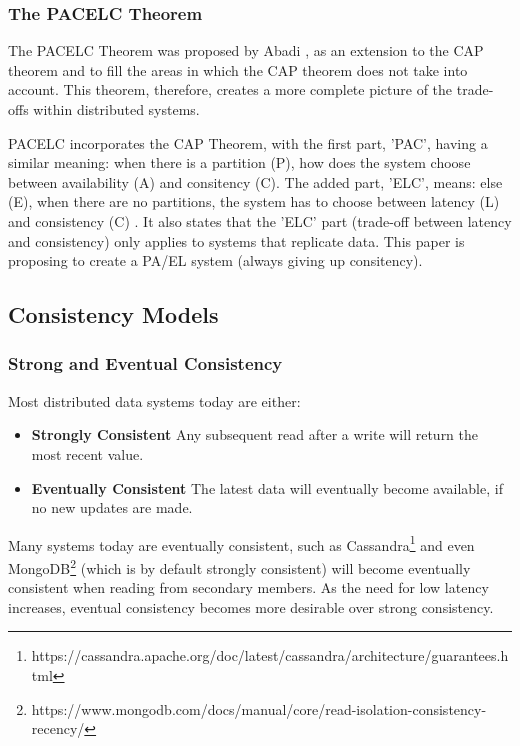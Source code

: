 \documentclass[12pt]{article}
\begin{document}
\subsubsection{The PACELC Theorem}
The PACELC Theorem was proposed by Abadi \cite{6127847}, as an extension to the CAP theorem and to fill the areas in which the CAP theorem does not take into account. This theorem, therefore, creates a more complete picture of the trade-offs within distributed systems. \par
PACELC incorporates the CAP Theorem, with the first part, 'PAC', having a similar meaning: when there is a partition (P), how does the system choose between availability (A) and consitency (C). The added part, 'ELC', means: else (E), when there are no partitions, the system has to choose between latency (L) and consistency (C) \cite{6127847}. It also states that the 'ELC' part (trade-off between latency and consistency) only applies to systems that replicate data. This paper is proposing to create a PA/EL \cite{6127847} system (always giving up consitency).

\subsection{Consistency Models}
\subsubsection{Strong and Eventual Consistency}
Most distributed data systems today are either:
\begin{itemize}
    \item \textbf{Strongly Consistent} Any subsequent read after a write will return the most recent value.
    \item \textbf{Eventually Consistent} The latest data will eventually become available, if no new updates are made.
\end{itemize}
Many systems today are eventually consistent, such as Cassandra\footnote{https://cassandra.apache.org/doc/latest/cassandra/architecture/guarantees.html} and even MongoDB\footnote{https://www.mongodb.com/docs/manual/core/read-isolation-consistency-recency/} (which is by default strongly consistent) will become eventually consistent when reading from secondary members. As the need for low latency increases, eventual consistency becomes more desirable over strong consistency. \par
\end{document}
